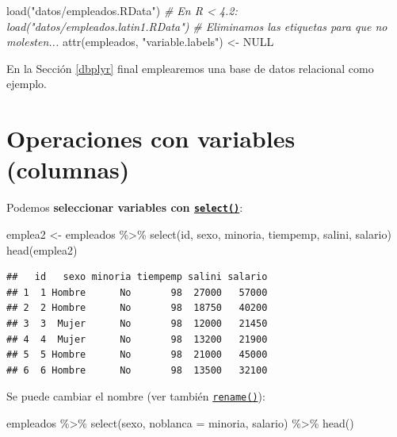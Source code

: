 \documentclass[
]{book}
\newenvironment{Shaded}{\begin{snugshade}}{\end{snugshade}}
\newcommand{\AttributeTok}[1]{\textcolor[rgb]{0.77,0.63,0.00}{#1}}
\newcommand{\CommentTok}[1]{\textcolor[rgb]{0.56,0.35,0.01}{\textit{#1}}}
\newcommand{\ConstantTok}[1]{\textcolor[rgb]{0.00,0.00,0.00}{#1}}
\newcommand{\FunctionTok}[1]{\textcolor[rgb]{0.00,0.00,0.00}{#1}}
\newcommand{\NormalTok}[1]{#1}
\newcommand{\OtherTok}[1]{\textcolor[rgb]{0.56,0.35,0.01}{#1}}
\newcommand{\SpecialCharTok}[1]{\textcolor[rgb]{0.00,0.00,0.00}{#1}}
\newcommand{\StringTok}[1]{\textcolor[rgb]{0.31,0.60,0.02}{#1}}
\theoremstyle{break}
\theoremstyle{nonumberplain}
\begin{document}
\begin{Shaded}
\begin{Highlighting}[]
\FunctionTok{load}\NormalTok{(}\StringTok{"datos/empleados.RData"}\NormalTok{)}
\CommentTok{\# En R \textless{} 4.2: load("datos/empleados.latin1.RData")}
\CommentTok{\# Eliminamos las etiquetas para que no molesten...}
\FunctionTok{attr}\NormalTok{(empleados, }\StringTok{"variable.labels"}\NormalTok{) }\OtherTok{\textless{}{-}} \ConstantTok{NULL}                  
\end{Highlighting}
\end{Shaded}

En la Sección \ref{dbplyr} final emplearemos una base de datos relacional como ejemplo.

\hypertarget{dplyr-variables}{%
\section{Operaciones con variables (columnas)}\label{dplyr-variables}}

Podemos \textbf{seleccionar variables con \href{https://dplyr.tidyverse.org/reference/select.html}{\texttt{select()}}}:

\begin{Shaded}
\begin{Highlighting}[]
\NormalTok{emplea2 }\OtherTok{\textless{}{-}}\NormalTok{ empleados }\SpecialCharTok{\%\textgreater{}\%} \FunctionTok{select}\NormalTok{(id, sexo, minoria, tiempemp, salini, salario)}
\FunctionTok{head}\NormalTok{(emplea2)}
\end{Highlighting}
\end{Shaded}

\begin{verbatim}
##   id   sexo minoria tiempemp salini salario
## 1  1 Hombre      No       98  27000   57000
## 2  2 Hombre      No       98  18750   40200
## 3  3  Mujer      No       98  12000   21450
## 4  4  Mujer      No       98  13200   21900
## 5  5 Hombre      No       98  21000   45000
## 6  6 Hombre      No       98  13500   32100
\end{verbatim}

Se puede cambiar el nombre (ver también \href{https://dplyr.tidyverse.org/reference/rename.html}{\texttt{rename()}}):

\begin{Shaded}
\begin{Highlighting}[]
\NormalTok{empleados }\SpecialCharTok{\%\textgreater{}\%} \FunctionTok{select}\NormalTok{(sexo, }\AttributeTok{noblanca =}\NormalTok{ minoria, salario) }\SpecialCharTok{\%\textgreater{}\%} \FunctionTok{head}\NormalTok{()}
\end{Highlighting}
\end{Shaded}
\end{document}
